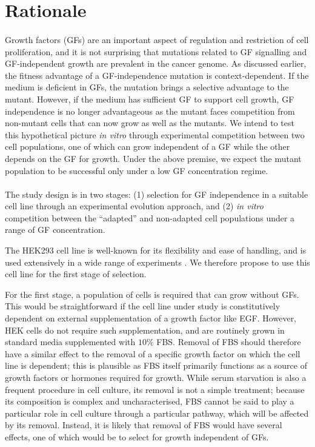 \documentclass[12pt, letterpaper, onecolumn]{article}
\begin{document}
	\section{Rationale}
	
	\paragraph{\empty}Growth factors (GFs) are an important aspect of regulation and restriction of cell proliferation, and it is not surprising that mutations related to GF signalling and GF-independent growth are prevalent in the cancer genome. As discussed earlier, the fitness advantage of a GF-independence mutation is context-dependent. If the medium is deficient in GFs, the mutation brings a selective advantage to the mutant. However, if the medium has sufficient GF to support cell growth, GF independence is no longer advantageous as the mutant faces competition from non-mutant cells that can now grow as well as the mutants. We intend to test this hypothetical picture \textit{in vitro} through experimental competition between two cell populations, one of which can grow independent of a GF while the other depends on the GF for growth. Under the above premise, we expect the mutant population to be successful only under a low GF concentration regime.
	
	\paragraph{\empty}The study design is in two stages: (1) selection for GF independence in a suitable cell line through an experimental evolution approach, and (2) \textit{in vitro} competition between the ``adapted'' and non-adapted cell populations under a range of GF concentration.
	
	
	The HEK293 cell line is well-known for its flexibility and ease of handling, and is used extensively in a wide range of experiments \cite{Thomas2005}. We therefore propose to use this cell line for the first stage of selection.
	
	
	For the first stage, a population of cells is required that can grow without GFs. This would be straightforward if the cell line under study is constitutively dependent on external supplementation of a growth factor like EGF. However, HEK cells do not require such supplementation, and are routinely grown in standard media supplemented with $10\%$ FBS. Removal of FBS should therefore have a similar effect to the removal of a specific growth factor on which the cell line is dependent; this is plausible as FBS itself primarily functions as a source of growth factors or hormones required for growth. While serum starvation is also a frequent procedure in cell culture, its removal is not a simple treatment; because its composition is complex and uncharacterised, FBS cannot be said to play a particular role in cell culture through a particular pathway, which will be affected by its removal. Instead, it is likely that removal of FBS would have several effects, one of which would be to select for growth independent of GFs.
	
\end{document}
